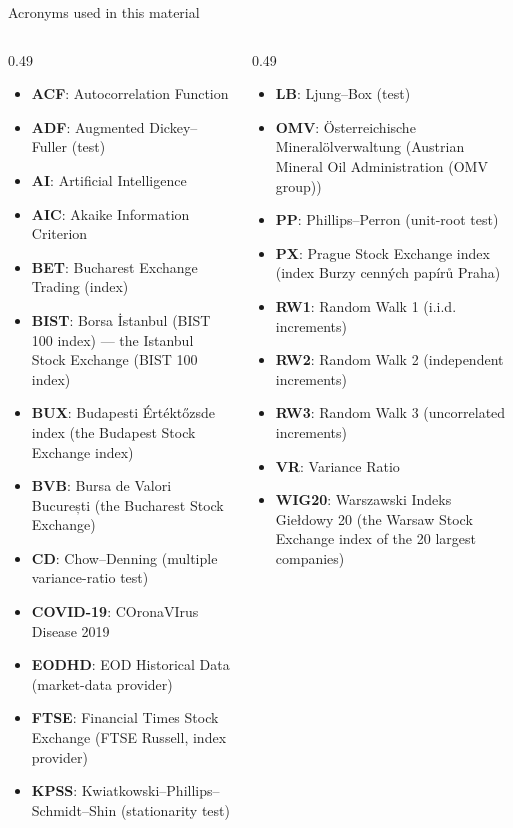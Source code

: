 \begin{frame}{Acronyms used in this material}
\begin{columns}[T]
\begin{column}{0.49\textwidth}
\begin{itemize}\setlength{\itemsep}{0pt}
    \item \textbf{ACF}: Autocorrelation Function
    \item \textbf{ADF}: Augmented Dickey–Fuller (test)
    \item \textbf{AI}: Artificial Intelligence
    \item \textbf{AIC}: Akaike Information Criterion
    \item \textbf{BET}: Bucharest Exchange Trading (index)
    \item \textbf{BIST}: Borsa İstanbul (BIST 100 index) — the Istanbul Stock Exchange (BIST 100 index)
    \item \textbf{BUX}: Budapesti Értéktőzsde index (the Budapest Stock Exchange index)
    \item \textbf{BVB}: Bursa de Valori București (the Bucharest Stock Exchange)
    \item \textbf{CD}: Chow–Denning (multiple variance-ratio test)
    \item \textbf{COVID-19}: COronaVIrus Disease 2019
    \item \textbf{EODHD}: EOD Historical Data (market-data provider)
    \item \textbf{FTSE}: Financial Times Stock Exchange (FTSE Russell, index provider)
    \item \textbf{KPSS}: Kwiatkowski–Phillips–Schmidt–Shin (stationarity test)
\end{itemize}
\end{column}
\begin{column}{0.49\textwidth}
\begin{itemize}\setlength{\itemsep}{0pt}
    \item \textbf{LB}: Ljung–Box (test)
    \item \textbf{OMV}: Österreichische Mineralölverwaltung (Austrian Mineral Oil Administration (OMV group))
    \item \textbf{PP}: Phillips–Perron (unit-root test)
    \item \textbf{PX}: Prague Stock Exchange index (index Burzy cenných papírů Praha)
    \item \textbf{RW1}: Random Walk 1 (i.i.d. increments)
    \item \textbf{RW2}: Random Walk 2 (independent increments)
    \item \textbf{RW3}: Random Walk 3 (uncorrelated increments)
    \item \textbf{VR}: Variance Ratio
    \item \textbf{WIG20}: Warszawski Indeks Giełdowy 20 (the Warsaw Stock Exchange index of the 20 largest companies)
\end{itemize}
\end{column}
\end{columns}
\end{frame}

